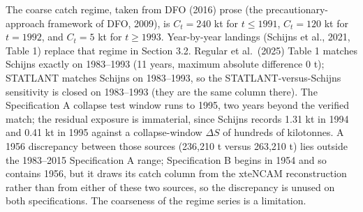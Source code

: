 \documentclass[11pt]{article}
\begin{document}
The coarse catch regime, taken from DFO (2016) prose (the
precautionary-approach framework of DFO, 2009), is \(C_t=240\) kt for
\(t\le 1991\), \(C_t=120\) kt for \(t=1992\), and \(C_t=5\) kt for
\(t\ge 1993\). Year-by-year landings (Schijns et al., 2021, Table 1)
replace that regime in Section 3.2. Regular et al.~(2025) Table 1
matches Schijns exactly on 1983--1993 (11 years, maximum absolute
difference 0 t); STATLANT matches Schijns on 1983--1993, so the
STATLANT-versus-Schijns sensitivity is closed on 1983--1993 (they are
the same column there). The Specification A collapse test window runs to
1995, two years beyond the verified match; the residual exposure is
immaterial, since Schijns records 1.31 kt in 1994 and 0.41 kt in 1995
against a collapse-window \(\Delta S\) of hundreds of kilotonnes. A
1956 discrepancy between those sources (236,210 t versus 263,210 t) lies
outside the 1983--2015 Specification A range; Specification B begins in
1954 and so contains 1956, but it draws its catch column from the
xteNCAM reconstruction rather than from either of these two sources, so
the discrepancy is unused on both specifications. The coarseness of the regime series is a limitation.
\end{document}

